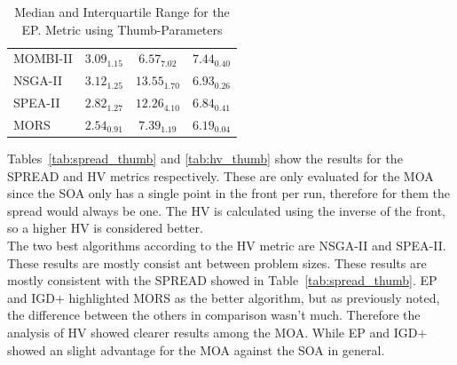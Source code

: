 \begin{table}[!htc]
{\begin{tabular}{@{}lccccccccc@{}}
MOMBI-II & \multicolumn{3}{c}{$3.09_{1.15}$}                   & \multicolumn{3}{c}{\cellcolor{gray95}$6.57_{7.02}$}  & \multicolumn{3}{c}{$7.44_{0.40}$}                   \\
NSGA-II  & \multicolumn{3}{c}{$3.12_{1.25}$}                   & \multicolumn{3}{c}{$13.55_{1.70}$}                   & \multicolumn{3}{c}{$6.93_{0.26}$}                   \\
SPEA-II  & \multicolumn{3}{c}{\cellcolor{gray25}$2.82_{1.27}$} & \multicolumn{3}{c}{$12.26_{4.10}$}                   & \multicolumn{3}{c}{$6.84_{0.41}$}                   \\
MORS     & \multicolumn{3}{c}{\cellcolor{gray95}$2.54_{0.91}$} & \multicolumn{3}{c}{\cellcolor{gray25}$7.39_{1.19}$}  & \multicolumn{3}{c}{\cellcolor{gray95}$6.19_{0.04}$} \\ \bottomrule
\end{tabular}%
}
\caption{Median and Interquartile Range for the EP. Metric using Thumb-Parameters}
\label{tab:ep_thumb}
\end{table}

Tables~\ref{tab:spread_thumb} and \ref{tab:hv_thumb} show the results for the SPREAD and HV metrics respectively. These are only evaluated for the MOA since the SOA only has a single point in the front per run, therefore for them the spread would always be one. The HV is calculated using the inverse of the front, so a higher HV is considered better.\\ 

The two best algorithms according to the HV metric are NSGA-II and SPEA-II. These results are mostly consist ant between problem sizes. These results are mostly consistent with the SPREAD showed in Table~\ref{tab:spread_thumb}. EP and IGD+ highlighted MORS as the better algorithm, but as previously noted, the difference between the others in comparison wasn't much. Therefore the analysis of HV showed clearer results among the MOA. While EP and IGD+ showed an slight advantage for the MOA against the SOA in general.\\
  
